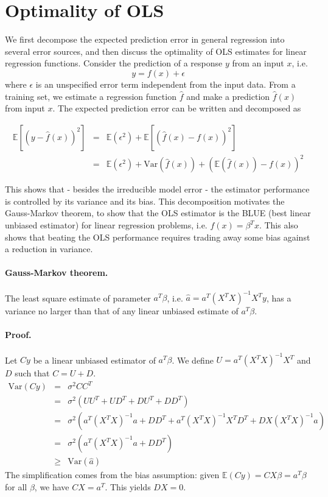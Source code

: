 \documentclass[]{article}
\begin{document}
\section{Optimality of OLS}

\noindent We first decompose the expected prediction error in general regression into several error sources, and then discuss the optimality of OLS estimates for linear regression functions. Consider the prediction of a response $y$ from an input $x$, i.e.
\begin{equation}
y = f(x)+\epsilon
\end{equation}
where $\epsilon$ is an unspecified error term independent from the input data. From a training set, we estimate a regression function $\hat{f}$ and make a prediction $\hat{f}(x)$ from input $x$. The expected prediction error can be written and decomposed as

\begin{eqnarray}
\mathbb{E}\left[\left(y-\hat{f}(x)\right)^2\right] &=& \mathbb{E}(\epsilon^2)+\mathbb{E}\left[\left(\hat{f}(x)-f(x)\right)^2\right] \\
&=&\mathbb{E}(\epsilon^2)+\mathrm{Var}\left(\hat{f}(x)\right)+\left(\mathbb{E}(\hat{f}(x))-f(x)\right)^2
\end{eqnarray}

\noindent This shows that - besides the irreducible model error - the estimator performance is controlled by its variance and its bias. This decomposition motivates the Gauss-Markov theorem, to show that the OLS estimator is the BLUE (best linear unbiased estimator) for linear regression problems, i.e. $f(x)=\beta^T x$. This also shows that beating the OLS performance requires trading away some bias against a reduction in variance.

\paragraph{Gauss-Markov theorem.} The least square estimate of parameter $a^T\beta$, i.e. $\hat{a}=a^T (X^TX)^{-1}X^Ty$, has a variance no larger than that of any linear unbiased estimate of $a^T\beta$.
\paragraph{Proof.} Let $Cy$ be a linear unbiased estimator of $a^T \beta$. We define $U=a^T(X^TX)^{-1}X^T$ and $D$ such that $C=U+D$. 
\begin{eqnarray}
\mathrm{Var}(Cy)&=&\sigma^2 C C^T\\
&=&\sigma^2 (UU^T+UD^T+DU^T+DD^T)\\
&=&\sigma^2 (a^T(X^TX)^{-1} a + DD^T+a^T(X^TX)^{-1}X^TD^T+DX(X^TX)^{-1}a)\\
&=&\sigma^2 (a^T(X^TX)^{-1} a + DD^T)\\
&\geq&\mathrm{Var}(\hat{a})
\end{eqnarray}
The simplification comes from the bias assumption: given $\mathbb{E}(Cy)=CX\beta=a^T\beta$ for all $\beta$, we have $CX=a^T$. This yields $DX=0$.
\end{document}
